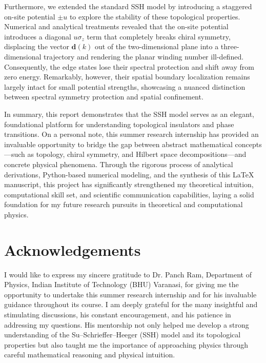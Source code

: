 \documentclass[11pt, a4paper]{article}
\begin{document}
Furthermore, we extended the standard SSH model by introducing a staggered on-site potential $\pm u$ to explore the stability of these topological properties. Numerical and analytical treatments revealed that the on-site potential introduces a diagonal $u\sigma_z$ term that completely breaks chiral symmetry, displacing the vector $\mathbf{d}(k)$ out of the two-dimensional plane into a three-dimensional trajectory and rendering the planar winding number ill-defined. Consequently, the edge states lose their spectral protection and shift away from zero energy. Remarkably, however, their spatial boundary localization remains largely intact for small potential strengths, showcasing a nuanced distinction between spectral symmetry protection and spatial confinement.

In summary, this report demonstrates that the SSH model serves as an elegant, foundational platform for understanding topological insulators and phase transitions. On a personal note, this summer research internship has provided an invaluable opportunity to bridge the gap between abstract mathematical concepts—such as topology, chiral symmetry, and Hilbert space decompositions—and concrete physical phenomena. Through the rigorous process of analytical derivations, Python-based numerical modeling, and the synthesis of this \LaTeX{} manuscript, this project has significantly strengthened my theoretical intuition, computational skill set, and scientific communication capabilities, laying a solid foundation for my future research pursuits in theoretical and computational physics.

\clearpage
\section*{Acknowledgements}
I would like to express my sincere gratitude to Dr. Panch Ram, Department of Physics, Indian Institute of Technology (BHU) Varanasi, for giving me the opportunity to undertake this summer research internship and for his invaluable guidance throughout its course. I am deeply grateful for the many insightful and stimulating discussions, his constant encouragement, and his patience in addressing my questions. His mentorship not only helped me develop a strong understanding of the Su–Schrieffer–Heeger (SSH) model and its topological properties but also taught me the importance of approaching physics through careful mathematical reasoning and physical intuition.
\end{document}
